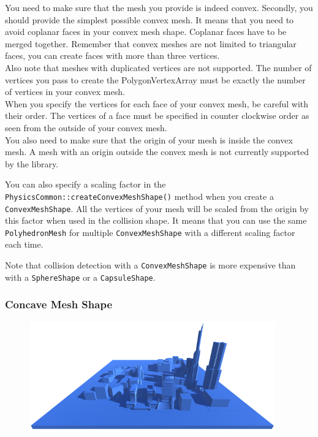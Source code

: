 \documentclass[a4paper,12pt]{article}
\begin{document}
    You need to make sure that the mesh you provide is indeed convex. Secondly, you should provide the simplest possible convex mesh. It means
    that you need to avoid coplanar faces in your convex mesh shape. Coplanar faces have to be merged together. Remember that convex meshes are
    not limited to triangular faces, you can create faces with more than three vertices. \\

    Also note that meshes with duplicated vertices are not supported. The number of vertices you pass to create the PolygonVertexArray must be exactly
    the number of vertices in your convex mesh. \\

    When you specify the vertices for each face of your convex mesh, be careful with their order. The vertices of a face must be specified in
    counter clockwise order as seen from the outside of your convex mesh. \\

    You also need to make sure that the origin of your mesh is inside the convex mesh. A mesh with an origin outside the
    convex mesh is not currently supported by the library. \\

    \begin{sloppypar}
    You can also specify a scaling factor in the \texttt{PhysicsCommon::createConvexMeshShape()} method when you create a
    \texttt{Convex\allowbreak MeshShape}. All the vertices of your mesh
    will be scaled from the origin by this factor when used in the collision shape. It means that you can use the same \texttt{PolyhedronMesh} for
    multiple \texttt{ConvexMeshShape} with a different scaling factor each time. \\
    \end{sloppypar}

    Note that collision detection with a \texttt{ConvexMeshShape} is more expensive than with a \texttt{SphereShape} or a \texttt{CapsuleShape}. \\

  \subsubsection{Concave Mesh Shape}

  \begin{figure}[h]
      \centering
      \includegraphics{concavemeshshape.png}
      \label{fig:concaveshape}
  \end{figure}
\end{document}
